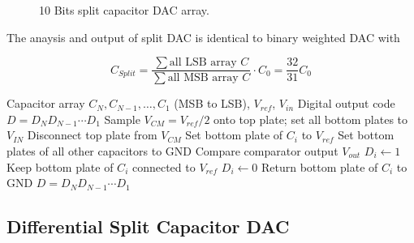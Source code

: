 \begin{figure}[h]
{
}
	\caption{10 Bits split capacitor DAC array.}
	\label{fig:dac_array2}
\end{figure}

The anaysis and output of split DAC is identical to binary weighted DAC with 

\begin{equation}
	C_{Split} = \frac{\sum \text{all LSB array } C}{\sum \text{all MSB array } C} \cdot C_0=\frac{32}{31}C_0
	\label{eq:csplit}
\end{equation}

\begin{algorithm}
	\caption{Charge-Redistribution SAR ADC: Switching Procedure (single ended)}
	\label{alg:sar_switching}
	\begin{algorithmic}[1]
		\Require Capacitor array $C_N, C_{N-1}, \dots, C_1$ (MSB to LSB), $V_{ref}$, $V_{in}$
		\Ensure Digital output code $D = D_N D_{N-1} \cdots D_1$
		\State Sample $V_{CM} = V_{ref}/2$ onto top plate; set all bottom plates to $V_{IN}$ 
		\State Disconnect top plate from $V_{CM}$ 
		\State Set bottom plate of $C_i$ to $V_{ref}$
		\State Set bottom plates of all other capacitors to $\text{GND}$
		\State Compare comparator output $V_{out}$
		\State $D_i \gets 1$
		\State Keep bottom plate of $C_i$ connected to $V_{ref}$
		\Else
		\State $D_i \gets 0$
		\State Return bottom plate of $C_i$ to $\text{GND}$
		\EndIf
		\EndFor
		\State \Return $D = D_N D_{N-1} \cdots D_1$
	\end{algorithmic}
\end{algorithm}
\subsection{Differential Split Capacitor DAC}



